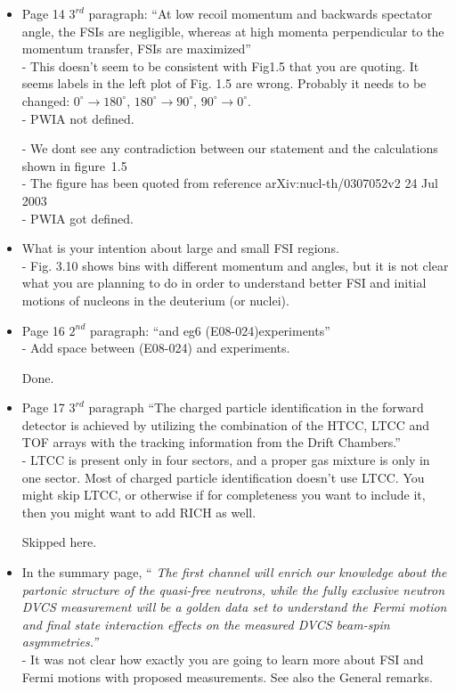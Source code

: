 \begin{itemize}
  \item Page 14 $3^{rd}$ paragraph: ``At low recoil momentum and
backwards spectator angle, the FSIs are negligible, whereas at high momenta perpendicular
to the momentum transfer, FSIs are maximized'' \\ 
  - This doesn't seem to be consistent with Fig1.5 that you are quoting. It seems labels in the left plot of Fig. 1.5 are wrong. Probably it needs to be changed: $0^{\circ}\rightarrow 180^{\circ}$, $180^{\circ}\rightarrow 90^{\circ}$, $90^{\circ}\rightarrow 0^{\circ}$.\\
  - PWIA not defined.

     {\color{red} 
     - We dont see any contradiction between our statement and the calculations 
       shown in figure~1.5\\
     - The figure has been quoted from reference arXiv:nucl-th/0307052v2  24 
       Jul 2003 \\
     - PWIA got defined. 

     }

  
  \item What is your intention about large and small FSI regions. \\
  - Fig. 3.10 shows bins with different momentum and angles, but it is not clear what you are planning to do in order to understand better FSI and initial motions of nucleons in the deuterium (or nuclei).
  
  \item Page 16 $2^{nd}$ paragraph: ``and eg6 (E08-024)experiments'' \\
  - Add space between (E08-024) and experiments.
     
     {\color{red} Done.}
  
 \item Page 17 $3^{rd}$ paragraph ``The charged particle identification in the 
    forward detector is achieved by utilizing the combination of the HTCC, LTCC 
    and TOF arrays with the tracking information from the Drift Chambers.'' \\
- LTCC is present only in four sectors, and a proper gas mixture is only in one 
  sector. Most of charged particle identification doesn't use LTCC. You might 
  skip LTCC, or otherwise if for completeness you want to include it, then you 
  might want to add RICH as well.
  
     {\color{red} Skipped here.}


\item In the summary page, ``\textit{ The first channel will enrich our 
   knowledge about the partonic structure of the quasi-free neutrons, while the 
   fully exclusive neutron DVCS measurement will be a golden data set to 
   understand the Fermi motion and final state interaction effects on the 
   measured DVCS beam-spin asymmetries.''}\\
- It was not clear how exactly you are going to learn more about FSI and Fermi motions with proposed measurements. See also the General remarks.

\end{itemize}
 


